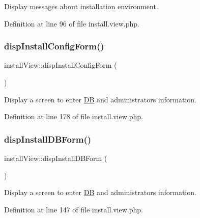 Display messages about installation environment. 



Definition at line 96 of file install.\+view.\+php.

\mbox{\label{classinstallView_ad61c851960b71aad3b93cfd1a23149fb}} 
\subsubsection{\texorpdfstring{disp\+Install\+Config\+Form()}{dispInstallConfigForm()}}
{\footnotesize\ttfamily install\+View\+::disp\+Install\+Config\+Form (\begin{DoxyParamCaption}{ }\end{DoxyParamCaption})}



Display a screen to enter \hyperlink{classDB}{DB} and administrator\textquotesingle{}s information. 



Definition at line 178 of file install.\+view.\+php.

\mbox{\label{classinstallView_a61a05991e6aa8bf2278b9c438b70c8c7}} 
\subsubsection{\texorpdfstring{disp\+Install\+D\+B\+Form()}{dispInstallDBForm()}}
{\footnotesize\ttfamily install\+View\+::disp\+Install\+D\+B\+Form (\begin{DoxyParamCaption}{ }\end{DoxyParamCaption})}



Display a screen to enter \hyperlink{classDB}{DB} and administrator\textquotesingle{}s information. 



Definition at line 147 of file install.\+view.\+php.

\mbox{\label{classinstallView_a811e5c499d36055efb16411c0f0946c1}} 
